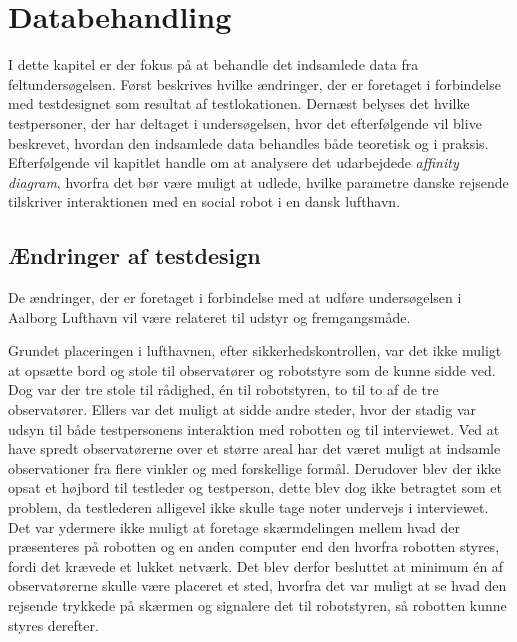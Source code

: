 \chapter{Databehandling}
\label{ParametreDatabehandling}
%
I dette kapitel er der fokus på at behandle det indsamlede data fra feltundersøgelsen. Først beskrives hvilke ændringer, der er foretaget i forbindelse med testdesignet som resultat af testlokationen. Dernæst belyses det hvilke testpersoner, der har deltaget i undersøgelsen, hvor det efterfølgende vil blive beskrevet, hvordan den indsamlede data behandles både teoretisk og i praksis. Efterfølgende vil kapitlet handle om at analysere det udarbejdede \textit{affinity diagram}, hvorfra det bør være muligt at udlede, hvilke parametre danske rejsende tilskriver interaktionen med en social robot i en dansk lufthavn. 

\section{Ændringer af testdesign}
\label{ParametreTestdesign}
%
De ændringer, der er foretaget i forbindelse med at udføre undersøgelsen i Aalborg Lufthavn vil være relateret til udstyr og fremgangsmåde. 

Grundet placeringen i lufthavnen, efter sikkerhedskontrollen, var det ikke muligt at opsætte bord og stole til observatører og robotstyre som de kunne sidde ved. Dog var der tre stole til rådighed, én til robotstyren, to til to af de tre observatører. Ellers var det muligt at sidde andre steder, hvor der stadig var udsyn til både testpersonens interaktion med robotten og til interviewet. Ved at have spredt observatørerne over et større areal har det været muligt at indsamle observationer fra flere vinkler og med forskellige formål. Derudover blev der ikke opsat et højbord til testleder og testperson, dette blev dog ikke betragtet som et problem, da testlederen alligevel ikke skulle tage noter undervejs i interviewet. Det var ydermere ikke muligt at foretage skærmdelingen mellem hvad der præsenteres på robotten og en anden computer end den hvorfra robotten styres, fordi det krævede et lukket netværk. Det blev derfor besluttet at minimum én af observatørerne skulle være placeret et sted, hvorfra det var muligt at se hvad den rejsende trykkede på skærmen og signalere det til robotstyren, så robotten kunne styres derefter.

